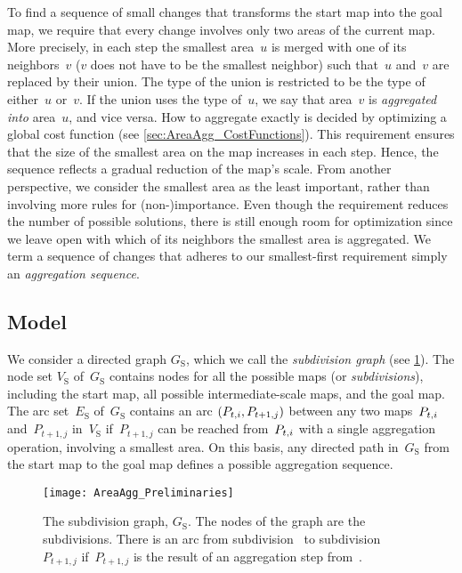 \documentclass[acmsmall,natbib=false]{acmart}
\begin{document}
To find a sequence of small changes 
that transforms the start map into the goal map,
we require that 
every change involves only two areas of the current map.
More precisely, in each step the smallest area~$u$ is merged 
with one of its neighbors~$v$ 
($v$ does not have to be the smallest neighbor)
such that~$u$ and~$v$ are replaced by their union.
The type of the union is restricted to be 
the type of either~$u$ or~$v$.
If the union uses the type of~$u$, 
we say that area~$v$ is \emph{aggregated into} area~$u$, 
and vice versa. 
How to aggregate exactly is decided by 
optimizing a global cost function
(see \sect\ref{sec:AreaAgg_CostFunctions}).
This requirement ensures that the 
size of the smallest area on the map increases in each step.
Hence, the sequence reflects a gradual reduction of the 
map's scale.
From another perspective, 
we consider the smallest area as the least important, 
rather than involving more rules for (non-)importance. 
Even though the requirement reduces 
the number of possible solutions,
there is still enough room for optimization 
since we leave open with
which of its neighbors the smallest area is aggregated.
We term a sequence of changes 
that adheres to our smallest-first requirement simply 
an \emph{aggregation sequence}.

\subsection{Model}
\label{sec:AreaAgg_Model}
We consider a directed graph $G_\mathrm{S}$, 
which we call the \emph{subdivision graph} 
(see \fig\ref{fig:AreaAgg_SubdivisionName}). 
The node set $V_\mathrm{S}$ of~$G_\mathrm{S}$ 
contains nodes for all the
possible maps (or \emph{subdivisions}), including the start map, 
all possible intermediate-scale maps, and the goal map.
The arc set~$E_\mathrm{S}$ of~$G_\mathrm{S}$ 
contains an arc $(P_{t,i}, P_{t+1,j})$ 
between any two maps~$P_{t,i}$ and~$P_{t+1,j}$ in~$V_\mathrm{S}$ 
if~$P_{t+1,j}$ can be reached from~$P_{t,i}$ 
with a single aggregation operation,
involving a smallest area.
On this basis, any directed path in~$G_\mathrm{S}$ 
from the start map to the goal map
defines a possible aggregation sequence.

\begin{figure}[tb]
\centering
\texttt{[image: AreaAgg\_Preliminaries]}
\caption{The subdivision graph, $G_\mathrm{S}$. 
	The nodes of the graph are the subdivisions. 
	There is an arc	from subdivision~\Pnode 
	to subdivision~${P}_{t+1,j}$ 
	if~${P}_{t+1,j}$ is the result of 
	an aggregation step from~\Pnode.}
\label{fig:AreaAgg_SubdivisionName}
\end{figure}
\end{document}
